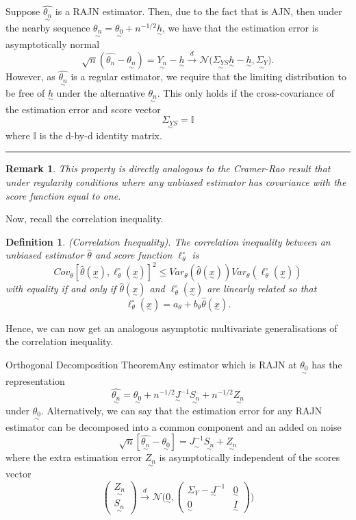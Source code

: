 \documentclass[twoside]{article}
\newtheorem{definition}[theorem]{Definition}
\newtheorem{remark}[theorem]{Remark}
\newenvironment{proof}{{\bf Proof:}}{\hfill\rule{2mm}{2mm}}
\newcommand{\utilde}{\underset{\sim}}
\begin{document}
\begin{proof} Suppose $\hat{\utilde{\theta_n}}$ is a RAJN estimator. Then, due to the fact that is AJN, then under the nearby sequence $\utilde{\theta_n} = \utilde{\theta_0} + n^{-1/2}\utilde{h}$, we have that the estimation error is asymptotically normal 
$$
\sqrt{n}(\hat{\theta_n} - \utilde{\theta_n}) = \utilde{Y_n} - \utilde{h} \xrightarrow{d} \mathcal{N}\big(\utilde{\Sigma_{YS}}\utilde{h} - \utilde{h}, \utilde{\Sigma_Y} \big).
$$
However, as $\hat{\utilde{\theta_n}}$ is a regular estimator, we require that the limiting distribution to be free of $\utilde{h}$ under the alternative $\utilde{\theta_n}.$ This only holds if the cross-covariance of the estimation error and score vector
$$
\utilde{\Sigma_{YS}} = \mathbb{I}
$$
where $\mathbb{I}$ is the d-by-d identity matrix.
\end{proof}

\begin{remark}This property is directly analogous to the Cramer-Rao result that under regularity conditions where any unbiased estimator has covariance with the score function equal to one.
\end{remark}

Now, recall the correlation inequality.
\begin{definition}(Correlation Inequality). The correlation inequality between an unbiased estimator $\hat{\theta}$ and score function $\ell_{\theta}^{\circ}$ is 
$$
Cov_{\theta}[\hat{\theta}(\utilde{x}), \ell_{\theta}^{\circ}(\utilde{x})]^2 \leq Var_{\theta}(\hat{\theta}(\utilde{x})) Var_{\theta}(\ell_{\theta}^{\circ}(\utilde{x}))
$$
with equality if and only if $\hat{\theta}(\utilde{x})$ and $\ell_{\theta}^{\circ}(\utilde{x})$ are linearly related so that 
$$
\ell_{\theta}^{\circ}(\utilde{x}) = a_{\theta} + b_{\theta}\hat{\theta}(\utilde{x}).
$$
\end{definition}

Hence, we can now get an analogous asymptotic multivariate generalisations of the correlation inequality. 

\begin{theorem_exam}{Orthogonal Decomposition Theorem}{}Any estimator which is RAJN at $\utilde{\theta_0}$ has the representation 
$$
\hat{\utilde{\theta_n}} = \utilde{\theta_0} + n^{-1/2}\utilde{J}^{-1}\utilde{S_n} + n^{-1/2}\utilde{Z_n}
$$
under $\utilde{\theta_0}$. Alternatively, we can say that the estimation error for any RAJN estimator can be decomposed into a common component and an added on noise
$$
\sqrt{n}[\hat{\utilde{\theta_n}} - \utilde{\theta_0}] = \utilde{J^{-1}}\utilde{S_n} + \utilde{Z_n}
$$
where the extra estimation error $\utilde{Z_n}$ is asymptotically independent of the scores vector 
$$
\begin{pmatrix}
\utilde{Z_n}\\
\utilde{S_n}
\end{pmatrix}
\xrightarrow{d}
\mathcal{N}\bigg(\utilde{0}, \begin{pmatrix}
\Sigma_Y - \utilde{J}^{-1} & \utilde{0}\\
\utilde{0} & \utilde{I}
\end{pmatrix}
 \bigg)
$$
\end{theorem_exam}
\end{document}
